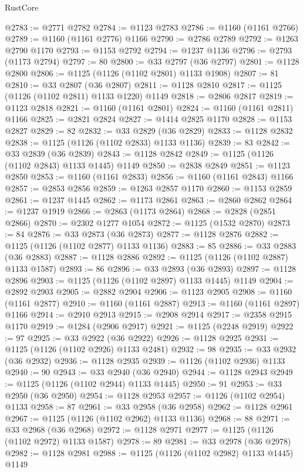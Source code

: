 \begin{lexlean}{RustCore}
\begin{coremodule}
@2783 := @2771 @2782
@2784 := @1123 @2783
@2786 := @1160 (@1161 @2766)
@2789 := @1160 (@1161 @2776) @1166
@2790 := @2786 @2789
@2792 := @1263 @2790 @1170
@2793 := @1153 @2792
@2794 := @1237 @1136
@2796 := @2793 (@1173 @2794)
@2797 := 80
@2800 := @33 @2797 (@36 @2797)
@2801 := @1128 @2800
@2806 := @1125 (@1126 (@1102 @2801) @1133 @1908)
@2807 := 81
@2810 := @33 @2807 (@36 @2807)
@2811 := @1128 @2810
@2817 := @1125 (@1126 (@1102 @2811) @1133 @1220) @1149
@2818 := @2806 @2817
@2819 := @1123 @2818
@2821 := @1160 (@1161 @2801)
@2824 := @1160 (@1161 @2811) @1166
@2825 := @2821 @2824
@2827 := @1414 @2825 @1170
@2828 := @1153 @2827
@2829 := 82
@2832 := @33 @2829 (@36 @2829)
@2833 := @1128 @2832
@2838 := @1125 (@1126 (@1102 @2833) @1133 @1136)
@2839 := 83
@2842 := @33 @2839 (@36 @2839)
@2843 := @1128 @2842
@2849 := @1125 (@1126 (@1102 @2843) @1133 @1445) @1149
@2850 := @2838 @2849
@2851 := @1123 @2850
@2853 := @1160 (@1161 @2833)
@2856 := @1160 (@1161 @2843) @1166
@2857 := @2853 @2856
@2859 := @1263 @2857 @1170
@2860 := @1153 @2859
@2861 := @1237 @1445
@2862 := @1173 @2861
@2863 := @2860 @2862
@2864 := @1237 @1919
@2866 := @2863 (@1173 @2864)
@2868 := @2828 (@2851 @2866)
@2870 := @2302 @1277 @1054
@2872 := @1125 (@1532 @2870)
@2873 := 84
@2876 := @33 @2873 (@36 @2873)
@2877 := @1128 @2876
@2882 := @1125 (@1126 (@1102 @2877) @1133 @1136)
@2883 := 85
@2886 := @33 @2883 (@36 @2883)
@2887 := @1128 @2886
@2892 := @1125 (@1126 (@1102 @2887) @1133 @1587)
@2893 := 86
@2896 := @33 @2893 (@36 @2893)
@2897 := @1128 @2896
@2903 := @1125 (@1126 (@1102 @2897) @1133 @1445) @1149
@2904 := @2892 @2903
@2905 := @2882 @2904
@2906 := @1123 @2905
@2908 := @1160 (@1161 @2877)
@2910 := @1160 (@1161 @2887)
@2913 := @1160 (@1161 @2897) @1166
@2914 := @2910 @2913
@2915 := @2908 @2914
@2917 := @2358 @2915 @1170
@2919 := @1284 (@2906 @2917)
@2921 := @1125 (@2248 @2919)
@2922 := 97
@2925 := @33 @2922 (@36 @2922)
@2926 := @1128 @2925
@2931 := @1125 (@1126 (@1102 @2926) @1133 @2481)
@2932 := 98
@2935 := @33 @2932 (@36 @2932)
@2936 := @1128 @2935
@2939 := @1126 (@1102 @2936) @1133
@2940 := 90
@2943 := @33 @2940 (@36 @2940)
@2944 := @1128 @2943
@2949 := @1125 (@1126 (@1102 @2944) @1133 @1445)
@2950 := 91
@2953 := @33 @2950 (@36 @2950)
@2954 := @1128 @2953
@2957 := @1126 (@1102 @2954) @1133
@2958 := 87
@2961 := @33 @2958 (@36 @2958)
@2962 := @1128 @2961
@2967 := @1125 (@1126 (@1102 @2962) @1133 @1136)
@2968 := 88
@2971 := @33 @2968 (@36 @2968)
@2972 := @1128 @2971
@2977 := @1125 (@1126 (@1102 @2972) @1133 @1587)
@2978 := 89
@2981 := @33 @2978 (@36 @2978)
@2982 := @1128 @2981
@2988 := @1125 (@1126 (@1102 @2982) @1133 @1445) @1149

\end{coremodule}
\end{lexlean}
